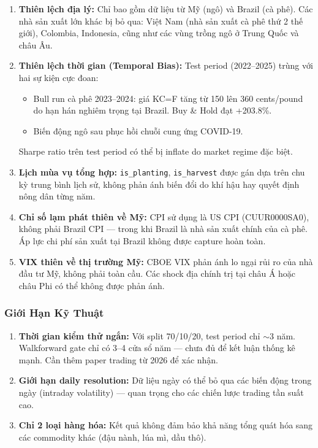 \begin{enumerate}
\item \textbf{Thiên lệch địa lý:} Chỉ bao gồm dữ liệu từ Mỹ (ngô) và Brazil (cà phê).
      Các nhà sản xuất lớn khác bị bỏ qua: Việt Nam (nhà sản xuất cà phê thứ 2 thế
      giới), Colombia, Indonesia, cũng như các vùng trồng ngô ở Trung Quốc và châu Âu.

\item \textbf{Thiên lệch thời gian (Temporal Bias):} Test period (2022--2025) trùng
      với hai sự kiện cực đoan:
      \begin{itemize}
      \item Bull run cà phê 2023--2024: giá KC=F tăng từ 150 lên 360 cents/pound
            do hạn hán nghiêm trọng tại Brazil. Buy \& Hold đạt +203.8\%.
      \item Biến động ngô sau phục hồi chuỗi cung ứng COVID-19.
      \end{itemize}
      Sharpe ratio trên test period có thể bị inflate do market regime đặc biệt.

\item \textbf{Lịch mùa vụ tổng hợp:} \texttt{is\_planting}, \texttt{is\_harvest}
      được gán dựa trên chu kỳ trung bình lịch sử, không phản ánh biến đổi do
      khí hậu hay quyết định nông dân từng năm.

\item \textbf{Chỉ số lạm phát thiên về Mỹ:} CPI sử dụng là US CPI (CUUR0000SA0),
      không phải Brazil CPI — trong khi Brazil là nhà sản xuất chính của cà phê.
      Áp lực chi phí sản xuất tại Brazil không được capture hoàn toàn.

\item \textbf{VIX thiên về thị trường Mỹ:} CBOE VIX phản ánh lo ngại rủi ro của
      nhà đầu tư Mỹ, không phải toàn cầu. Các shock địa chính trị tại châu Á hoặc
      châu Phi có thể không được phản ánh.
\end{enumerate}

\subsubsection{Giới Hạn Kỹ Thuật}

\begin{enumerate}
\item \textbf{Thời gian kiểm thử ngắn:} Với split 70/10/20, test period chỉ $\sim$3
      năm. Walkforward gate chỉ có 3--4 cửa sổ năm — chưa đủ để kết luận thống kê
      mạnh. Cần thêm paper trading từ 2026 để xác nhận.

\item \textbf{Giới hạn daily resolution:} Dữ liệu ngày có thể bỏ qua các biến động
      trong ngày (intraday volatility) — quan trọng cho các chiến lược trading tần suất cao.

\item \textbf{Chỉ 2 loại hàng hóa:} Kết quả không đảm bảo khả năng tổng quát hóa
      sang các commodity khác (đậu nành, lúa mì, dầu thô).
\end{enumerate}

